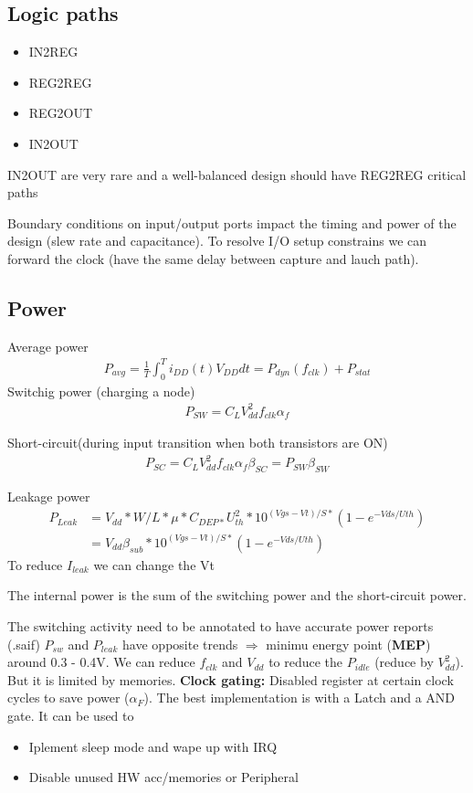 \subsection{Logic paths}
\begin{itemize}
  \item IN2REG
  \item REG2REG
  \item REG2OUT
  \item IN2OUT
\end{itemize}
IN2OUT are very rare and a well-balanced design should have REG2REG critical paths

\bigbreak
Boundary conditions on input/output ports impact the timing and power of the design (slew rate and capacitance). To resolve I/O setup constrains we can forward the clock (have the same delay between capture and lauch path).


\subsection{Power}
Average power
\begin{align}
P_{avg} = \frac{1}{T} \int_0^T i_{DD}(t) V_{DD}dt = P_{dyn}(f_{clk}) + P_{stat}
\end{align}
Switchig power (charging a node)
\begin{align}
 P_{SW} = C_L V^2_{dd} f_{clk} \alpha_f
\end{align}

Short-circuit(during input transition when both transistors are ON)
\begin{align}
  P_{SC} = C_L V^2_{dd} f_{clk} \alpha_f \beta_{SC} = P_{SW} \beta_{SW} 
\end{align}

Leakage power
\begin{align}
  P_{Leak} &= V_{dd} * W/L *\mu * C_{DEP*} U_{th}^2* 10^{(Vgs-Vt)/S *} (1 -e ^{-Vds/Uth})\\
           &= V_{dd} \beta_{sub} * 10^{(Vgs-Vt)/S *} (1 -e ^{-Vds/Uth})
\end{align}
To reduce \(I_{leak}\) we can change the Vt %
\bigbreak

The internal power is the sum of the switching power and the short-circuit power.

The switching activity need to be annotated to have accurate power reports (.saif)
\bigbreak
\(P_{sw}\) and \(P_{leak}\) have opposite trends \(\Rightarrow\) minimu energy point (\textbf{MEP}) around 0.3 - 0.4V. We can reduce \(f_{clk}\) and \(V_{dd}\)  to reduce the \(P_{idle}\) (reduce by \(V_{dd}^2\)). But it is limited by memories. %
\bigbreak
\textbf{Clock gating:} Disabled register at certain clock cycles to save power (\(\alpha_F\)). The best implementation is with a Latch and a AND gate. It can be used to
\begin{itemize}
  \item Iplement sleep mode and wape up with IRQ
  \item Disable unused HW acc/memories or Peripheral
\end{itemize}

